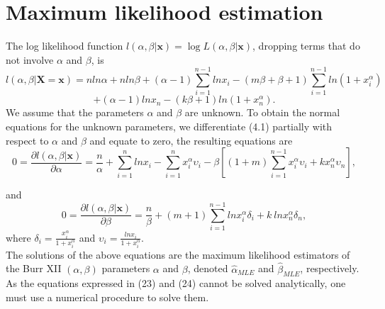 \documentclass[a4paper, 11pt]{article}
\numberwithin{equation}{section}
\begin{document}
\section{Maximum likelihood estimation}
The log likelihood function $l(\alpha, \beta|\mathbf{x})=\log L(\alpha, \beta|\mathbf{x})$, dropping terms that do not involve $\alpha$ and $\beta$, is 
\begin{equation*}
l(\alpha, \beta|\mathbf{X=x})=nln\alpha+nln\beta+(\alpha-1)\sum_{i=1}^{n-1}ln x_{i}-(m\beta+\beta+1)\sum_{i=1}^{n-1}ln(1+x_{i}^{\alpha})
\end{equation*}
\begin{equation}
+(\alpha-1)lnx_{n}-(k\beta+1)ln(1+x_{n}^{\alpha}).
\end{equation}
We assume that the parameters $\alpha$ and $\beta$ are unknown. To obtain the normal equations for the unknown parameters, we differentiate (4.1) partially with respect to $\alpha$ and $\beta$ and equate to zero, the resulting equations are 
\begin{equation}
0=\frac{\partial l(\alpha, \beta|\mathbf{x})}{\partial \alpha}=\frac{n}{\alpha}+\sum_{i=1}^{n}ln x_{i}-\sum_{i=1}^{n}x_{i}^{\alpha}\upsilon_{i}-\beta\left[(1+m)\sum_{i=1}^{n-1}x_{i}^{\alpha}\upsilon_{i}+k x_{n}^{\alpha}\upsilon_{n}\right],
\label{alfa_mle}
\end{equation}

and
\begin{equation}
0=\frac{\partial l(\alpha, \beta|\mathbf{x})}{\partial \beta}=\frac{n}{\beta}+(m+1)\sum_{i=1}^{n-1}ln x_{i}^{\alpha}\delta_{i}+k~ln x_{n}^{\alpha}\delta_{n},
\label{beta_mle}
\end{equation}
where
$\delta_{i}=\frac{x_{i}^{\alpha}}{1+x_{i}^{\alpha}}$ and $\upsilon_{i}=\frac{ln x_{i}}{1+x_{i}^{\alpha}}$.\\The solutions of the above equations are the maximum likelihood estimators of the Burr XII $(\alpha, \beta)$ parameters $\alpha$  and $\beta$, denoted  $\hat{\alpha}_{MLE}$  and $\hat{\beta}_{MLE}$, respectively. As the equations expressed in (23) and (24) cannot be solved analytically, one must use a numerical procedure to solve them.
\end{document}
